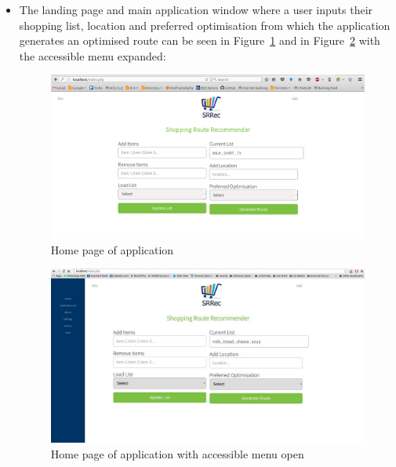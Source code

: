 \documentclass[10pt,twocolumn]{witseiepaper}
\begin{document}
\begin{itemize}
			\item The landing page and main application window where a user inputs their shopping list, location and preferred optimisation from which the application generates an optimised route can be seen in Figure~\ref{home page} and in Figure~\ref{home page_menu} with the accessible menu expanded:
			\begin{figure}[htbp]
				\centering
				\includegraphics[width = \columnwidth]{../images/index_new.png}
				\caption{Home page of application}
				\label{home page}
			\end{figure}
			
			\begin{figure}[h!]
				\centering
				\includegraphics[width = \columnwidth]{../images/home_page_with_menu.jpg}
				\caption{Home page of application with accessible menu open}
				\label{home page_menu}
			\end{figure}
			

\end{itemize}
\end{document}
